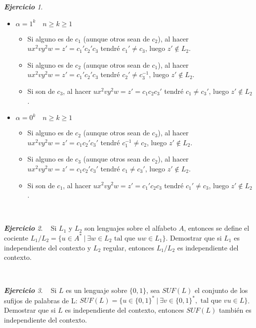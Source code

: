 \documentclass[12pt,spanish]{article}
\theoremstyle{definition}
\theoremstyle{remark}
\newtheorem{exercise}{\textbf{Ejercicio}}%
\begin{document}
\begin{exercise}
\begin{itemize}
  \item $\alpha = 1^k \quad n \geq k\geq 1$
    \begin{itemize}
    \item Si alguno es de $c_1$ (aunque otros sean de $c_2$), al hacer
      $ux^2vy^2w=z'=c_1'c_2'c_3$ tendré $c_1'\neq c_3$, luego
      $z' \notin L_2$.
    \item Si alguno es de $c_2$ (aunque otros sean de $c_1$), al hacer
      $ux^2vy^2w=z'=c_1'c_2'c_3$ tendré $c_2'\neq c_3^{-1}$, luego
      $z' \notin L_2$.
    \item Si son de $c_3$, al hacer $ux^2vy^2w=z'=c_1c_2c_3'$ tendré
      $c_1\neq c_3'$, luego $z' \notin L_2$.
    \end{itemize}

    \item $\alpha = 0^k \quad n \geq k\geq 1$
    \begin{itemize}
    \item Si alguno es de $c_2$ (aunque otros sean de $c_3$), al hacer
      $ux^2vy^2w=z'=c_1c_2'c_3'$ tendré $c_1^{-1}\neq c_2$, luego
      $z' \notin L_2$.
    \item Si alguno es de $c_3$ (aunque otros sean de $c_2$), al hacer
      $ux^2vy^2w=z'=c_1c_2'c_3'$ tendré $c_1\neq c_3'$, luego
      $z' \notin L_2$.
    \item Si son de $c_1$, al hacer $ux^2vy^2w=z'=c_1'c_2c_3$ tendré
      $c_1'\neq c_3$, luego $z' \notin L_2$.
    \end{itemize}
  \end{itemize}
\end{exercise}

~

\setcounter{exercise}{20}

\begin{exercise}~ Si $L_1$ y $L_2$ son lenguajes sobre el alfabeto
  $A$, entonces se define el cociente
  $L_1/L_2=\{u\in A^*\ |\ \exists w \in L_2 \text{ tal que } uw \in
  L_1\}$. Demostrar que si $L_1$ es independiente del contexto y $L_2$
  regular, entonces $L_1/L_2$ es independiente del contexto.
  
\end{exercise}

~

\begin{exercise}~ Si $L$ es un lenguaje sobre $\{0,1\}$, sea $SUF(L)$
  el conjunto de los sufijos de palabras de L:
  $SUF(L)=\{u\in\{0,1\}^*\ |\ \exists v \in \{0,1\}^*, \text{ tal que
  } vu \in L\}$. Demostrar que si $L$ es independiente del contexto,
  entonces $SUF(L)$ también es independiente del contexto. 
  
\end{exercise}
\end{document}
